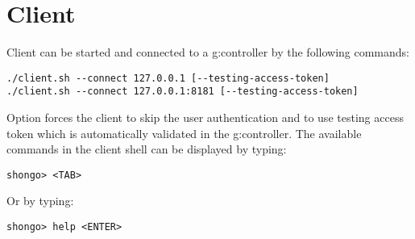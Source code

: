 \section{Client}
Client can be started and connected to a \gls{g:controller} by the following commands:
\begin{verbatim}
./client.sh --connect 127.0.0.1 [--testing-access-token]
./client.sh --connect 127.0.0.1:8181 [--testing-access-token]
\end{verbatim}
Option  forces the client to skip the user authentication and to use testing access token which is automatically validated in the \gls{g:controller}.
The available commands in the client shell can be displayed by typing:
\begin{verbatim}
shongo> <TAB>
\end{verbatim}
Or by typing:
\begin{verbatim}
shongo> help <ENTER>
\end{verbatim}


